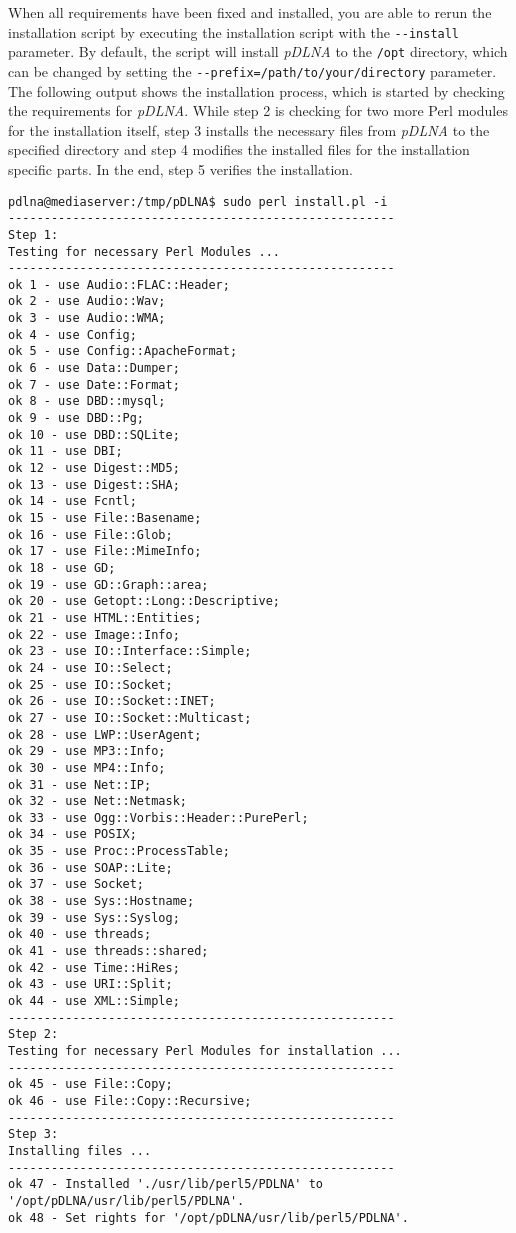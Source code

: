 When all requirements have been fixed and installed, you are able to rerun the installation script by executing the installation script with the \verb|--install| parameter. By default, the script will install {\em pDLNA} to the \verb|/opt| directory, which can be changed by setting the \verb|--prefix=/path/to/your/directory| parameter. The following output shows the installation process, which is started by checking the requirements for {\em pDLNA}. While step 2 is checking for two more Perl modules for the installation itself, step 3 installs the necessary files from {\em pDLNA} to the specified directory and step 4 modifies the installed files for the installation specific parts. In the end, step 5 verifies the installation.
\begin{lstlisting}
pdlna@mediaserver:/tmp/pDLNA$ sudo perl install.pl -i
------------------------------------------------------
Step 1:
Testing for necessary Perl Modules ...
------------------------------------------------------
ok 1 - use Audio::FLAC::Header;
ok 2 - use Audio::Wav;
ok 3 - use Audio::WMA;
ok 4 - use Config;
ok 5 - use Config::ApacheFormat;
ok 6 - use Data::Dumper;
ok 7 - use Date::Format;
ok 8 - use DBD::mysql;
ok 9 - use DBD::Pg;
ok 10 - use DBD::SQLite;
ok 11 - use DBI;
ok 12 - use Digest::MD5;
ok 13 - use Digest::SHA;
ok 14 - use Fcntl;
ok 15 - use File::Basename;
ok 16 - use File::Glob;
ok 17 - use File::MimeInfo;
ok 18 - use GD;
ok 19 - use GD::Graph::area;
ok 20 - use Getopt::Long::Descriptive;
ok 21 - use HTML::Entities;
ok 22 - use Image::Info;
ok 23 - use IO::Interface::Simple;
ok 24 - use IO::Select;
ok 25 - use IO::Socket;
ok 26 - use IO::Socket::INET;
ok 27 - use IO::Socket::Multicast;
ok 28 - use LWP::UserAgent;
ok 29 - use MP3::Info;
ok 30 - use MP4::Info;
ok 31 - use Net::IP;
ok 32 - use Net::Netmask;
ok 33 - use Ogg::Vorbis::Header::PurePerl;
ok 34 - use POSIX;
ok 35 - use Proc::ProcessTable;
ok 36 - use SOAP::Lite;
ok 37 - use Socket;
ok 38 - use Sys::Hostname;
ok 39 - use Sys::Syslog;
ok 40 - use threads;
ok 41 - use threads::shared;
ok 42 - use Time::HiRes;
ok 43 - use URI::Split;
ok 44 - use XML::Simple;
------------------------------------------------------
Step 2:
Testing for necessary Perl Modules for installation ...
------------------------------------------------------
ok 45 - use File::Copy;
ok 46 - use File::Copy::Recursive;
------------------------------------------------------
Step 3:
Installing files ...
------------------------------------------------------
ok 47 - Installed './usr/lib/perl5/PDLNA' to '/opt/pDLNA/usr/lib/perl5/PDLNA'.
ok 48 - Set rights for '/opt/pDLNA/usr/lib/perl5/PDLNA'.

\end{lstlisting}
